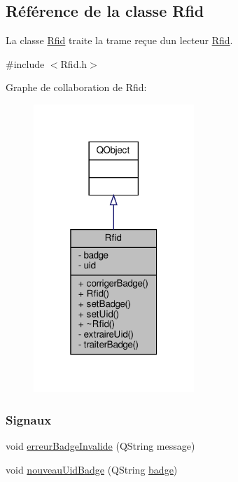 \hypertarget{class_rfid}{}\subsection{Référence de la classe Rfid}
\label{class_rfid}


La classe \hyperlink{class_rfid}{Rfid} traite la trame reçue d\textquotesingle{}un lecteur \hyperlink{class_rfid}{Rfid}.  




{\ttfamily \#include $<$Rfid.\+h$>$}



Graphe de collaboration de Rfid\+:
\nopagebreak
\begin{figure}[H]
\begin{center}
\leavevmode
\includegraphics[width=172pt]{class_rfid__coll__graph}
\end{center}
\end{figure}
\subsubsection*{Signaux}
\begin{DoxyCompactItemize}
\item 
void \hyperlink{class_rfid_a896a20a2fbe2ac7d842456a1161717cb}{erreur\+Badge\+Invalide} (Q\+String message)
\item 
void \hyperlink{class_rfid_a76990ba3147098e80ac6fc67af6439d1}{nouveau\+Uid\+Badge} (Q\+String \hyperlink{class_rfid_ac634cd26ffbe1c6da3967dc4af53b734}{badge})
\end{DoxyCompactItemize}
